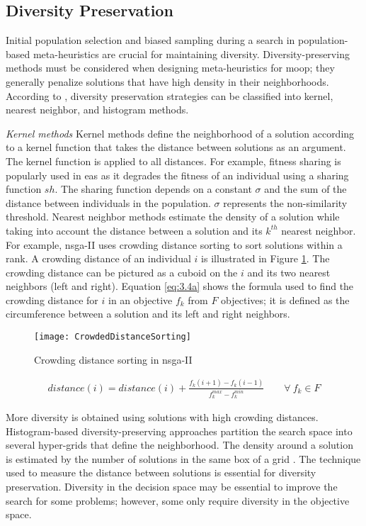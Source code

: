 \subsection{Diversity Preservation}\label{sec:diversitypreservation}
Initial population selection and biased sampling during a search in population-based meta-heuristics are crucial for maintaining diversity. Diversity-preserving methods must be considered when designing meta-heuristics for \gls{moop}; they generally penalize solutions that have high density in their neighborhoods. According to \parencite{Emmerich2018AMethods}, diversity preservation strategies can be classified into kernel, nearest neighbor, and histogram methods.

\textit{Kernel methods} Kernel methods define the neighborhood of a solution according to a kernel function that takes the distance between solutions as an argument. The kernel function is applied to all distances. For example, fitness sharing is popularly used in \glspl{ea} as it degrades the fitness of an individual using a sharing function $sh$. The sharing function depends on a constant $\sigma$ and the sum of the distance between individuals in the population. $\sigma$ represents the non-similarity threshold. Nearest neighbor methods estimate the density of a solution while taking into account the distance between a solution and its $k^{th}$ nearest neighbor. For example, \gls{nsga}-II uses crowding distance sorting to sort solutions within a rank. A crowding distance of an individual $i$ is illustrated in Figure \ref{fig:crowdeddistance_sorting}. The crowding distance can be pictured as a cuboid on the $i$ and its two nearest neighbors (left and right). Equation \ref{eq:3.4a} shows the formula used to find the crowding distance for $i$ in an objective $f_k$ from $F$ objectives; it is defined as the circumference between a solution and its left and right neighbors.

\begin{figure}
    \centering
    \texttt{[image: CrowdedDistanceSorting]}
    \caption{Crowding distance sorting in \gls{nsga}-II}
    \label{fig:crowdeddistance_sorting}
\end{figure}

\begin{align}
    distance(i) = distance(i) + \frac{f_k(i+1) - f_k(i-1)}{f_k^{max} - f_k^{min}} \qquad \forall \ f_k \in F \label{eq:3.4a} 
\end{align}

More diversity is obtained using solutions with high crowding distances. Histogram-based diversity-preserving approaches partition the search space into several hyper-grids that define the neighborhood. The density around a solution is estimated by the number of solutions in the same box of a grid \parencite{Talbi2009Metaheuristics:Implementation}. The technique used to measure the distance between solutions is essential for diversity preservation. Diversity in the decision space may be essential to improve the search for some problems; however, some only require diversity in the objective space.


